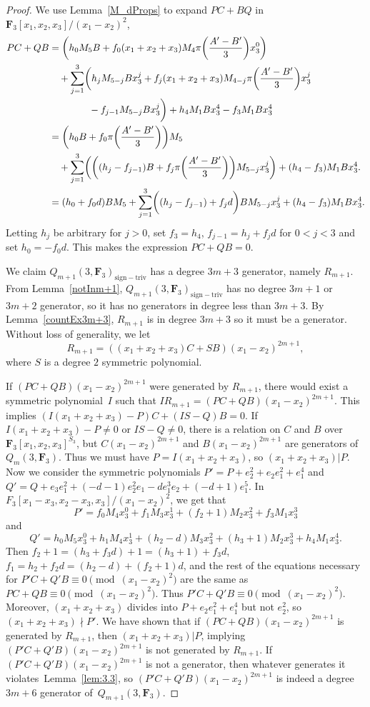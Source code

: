 \documentclass[pdftex]{sigma}
\theoremstyle{definition}
\numberwithin{equation}{section}
\newcommand{\siv}{\mathrm{sign-triv}}
\begin{document}
\begin{proof}
 We use Lemma~\ref{M_dProps} to expand $PC+BQ$ in $\mathbf{F}_3[x_1,x_2,x_3]/(x_1-x_2)^2$,
 \begin{align*}
 PC+QB&=\biggl(h_0M_5B+f_0(x_1+x_2+x_3)M_4\pi\biggl(\frac{A'-B'}{3}\biggr)x_3^0\biggr) \\
 &\quad + \sum _{j=1}^{3}\biggl(h_{j}M_{5-j}Bx_3^j+f_{j}(x_1+x_2+x_3)M_{4-j}\pi\biggl(\frac{A'-B'}{3}\biggr)x_3^{j}\\
 &\quad\hphantom{+ \sum _{j=1}^{3}\biggl(}{}- f_{j-1}M_{5-j}Bx_3^j\bigg)+ h_4M_1Bx_3^4-f_3M_1Bx_3^4 \\
 &=\biggl(h_0B+f_0\pi\biggl(\frac{A'-B'}{3}\biggr)\biggr)M_5 \\
 &\quad + \sum _{j=1}^{3}\biggl(\biggl((h_{j} - f_{j-1})B+f_{j}\pi\biggl(\frac{A'-B'}{3}\biggr)\biggr)M_{5-j}x_3^j\biggr) + (h_4-f_3)M_1Bx_3^4. \\
 &=(h_0+f_0d)BM_5 + \sum _{j=1}^{3}\biggl((h_{j} - f_{j-1})+f_{j}d\biggr)BM_{5-j}x_3^j + (h_4-f_3)M_1Bx_3^4.
 \end{align*}
 Letting $h_j$ be arbitrary for $j>0$, set $f_3=h_4$, $f_{j-1} = h_{j}+f_jd$ for $0<j<3$ and set $h_0=-f_0d$. This makes the expression $PC+QB=0$.

 We claim $Q_{m+1}(3,\mathbf{F}_3)_{\siv}$ has a degree $3m+3$ generator, namely $R_{m+1}$. From Lemma~\ref{notInm+1}, $Q_{m+1}(3,\mathbf{F}_3)_{\siv}$ has no degree $3m+1$ or $3m+2$ generator, so it has no generators in degree less than $3m+3$. By Lemma~\ref{countEx3m+3}, $R_{m+1}$ is in degree $3m+3$ so it must be a generator. Without loss of generality, we let
 \[R_{m+1}=\left((x_1+x_2+x_3)C + SB\right)(x_1-x_2)^{2m+1},\]
 where $S$ is a degree $2$ symmetric polynomial.

 If $(PC+QB)(x_1-x_2)^{2m+1}$ were generated by $R_{m+1}$, there would exist a symmetric polynomial~$I$ such that $IR_{m+1}=(PC+QB)(x_1-x_2)^{2m+1}$. This implies $(I(x_1+x_2+x_3)-P)C+(IS-Q)B=0$. If $I(x_1+x_2+x_3)-P\neq 0$ or $IS-Q\neq 0$, there is a relation on $C$ and $B$ over $\mathbf{F}_3[x_1,x_2,x_3]^{S_3}$, but $C(x_1-x_2)^{2m+1}$ and $B(x_1-x_2)^{2m+1}$ are generators of $Q_m(3,\mathbf{F}_3)$. Thus we must have $P= I(x_1+x_2+x_3)$, so $(x_1+x_2+x_3)|P$. Now we consider the symmetric polynomials $P'=P+e_2^2+e_2e_1^2+e_1^4$ and $Q' = Q+e_3e_1^2+(-d-1)e_2^2e_1-de_1^3e_2+(-d+1)e_1^5$. In $F_3[x_1-x_3,x_2-x_3,x_3]/(x_1-x_2)^2$, we get that
 \[P'=f_0M_4x_3^0+f_1M_{3}x_3^1 + (f_{2}+1)M_2x_3^{2}+f_{3}M_1x_3^{3}\]
 and
 \[Q'=h_0M_5x_3^0+h_1M_4x_3^1+(h_2-d)M_3x_3^2+(h_3+1)M_2x_3^3+h_4M_1x_3^4.\]
 Then $f_2+1 = (h_3+f_3d)+1=(h_3+1)+f_3d$, $f_1=h_2+f_2d = (h_2-d)+(f_2+1)d$, and the rest of the equations necessary for $P'C+Q'B\equiv 0\pmod{(x_1-x_2)^2}$ are the same as $PC+QB\equiv 0\pmod{(x_1-x_2)^2}$. Thus $P'C+Q'B\equiv 0\pmod{(x_1-x_2)^2}$. Moreover, $(x_1+x_2+x_3)$ divides into $P+e_2e_1^2+e_1^4$ but not $e_2^2$, so $(x_1+x_2+x_3)\nmid P'$. We have shown that if ${(PC+QB)(x_1-x_2)^{2m+1}}$ is generated by $R_{m+1}$, then $(x_1+x_2+x_3)|P$, implying ${(P'C+Q'B)(x_1-x_2)^{2m+1}}$ is not generated by $R_{m+1}$. If $(P'C+Q'B)(x_1-x_2)^{2m+1}$ is not a generator, then whatever generates it violates~Lemma~\ref{lem:3.3}, so $(P'C+Q'B)(x_1-x_2)^{2m+1}$ is indeed a degree $3m+6$ generator of~$Q_{m+1}(3,\mathbf{F}_3)$.
 \end{proof}
\end{document}
